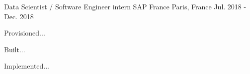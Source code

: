 

\begin{cventries}

  \cventry
    {Data Scientist / Software Engineer intern} %
    {SAP France} %
    {Paris, France} %
    {Jul. 2018 - Dec. 2018} %
    {
      \begin{cvitems} %
        \item {Provisioned...}
        \item {Built...}
        \item {Implemented...}
      \end{cvitems}
    }
\end{cventries}
